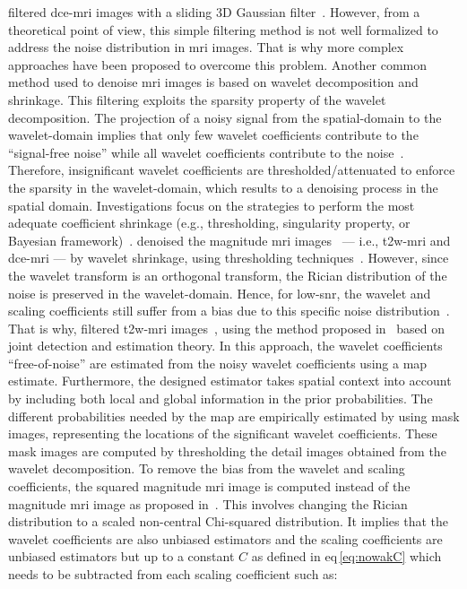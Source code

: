 \begin{enumerate}[leftmargin=*]
\citeauthor{samarasinghe2016semi} filtered \ac{dce}-\ac{mri} images with a
sliding 3D Gaussian filter~\cite{samarasinghe2016semi}.
However, from a theoretical point of view, this simple filtering method is not
well formalized to address the noise distribution in \ac{mri} images.
That is why more complex approaches have been proposed to overcome this problem.
Another common method used to denoise \ac{mri} images is based on wavelet
decomposition and shrinkage.
This filtering exploits the sparsity property of the wavelet decomposition.
The projection of a noisy signal from the spatial-domain to the wavelet-domain
implies that only few wavelet coefficients contribute to the ``signal-free
noise'' while all wavelet coefficients contribute to the
noise~\cite{Donoho1994}.
Therefore, insignificant wavelet coefficients are thresholded/attenuated to
enforce the sparsity in the wavelet-domain, which results to a denoising
process in the spatial domain.
Investigations focus on the strategies to perform the most adequate coefficient
shrinkage (e.g., thresholding, singularity property, or Bayesian
framework)~\cite{Pizurica2002}.
\citeauthor{Ampeliotis2008} denoised the magnitude \ac{mri}
images~\cite{Ampeliotis2007,Ampeliotis2008} --- i.e., \ac{t2w}-\ac{mri} and
\ac{dce}-\ac{mri} --- by wavelet shrinkage, using thresholding
techniques~\cite{Mallat2008}.
However, since the wavelet transform is an orthogonal transform, the Rician
distribution of the noise is preserved in the wavelet-domain.
Hence, for low-\ac{snr}, the wavelet and scaling coefficients still suffer from
a bias due to this specific noise distribution~\cite{Nowak1999}.
That is why, \citeauthor{Lopes2011} filtered \ac{t2w}-\ac{mri}
images~\cite{Lopes2011}, using the method proposed in~\cite{Pizurica2003} based
on joint detection and estimation theory.
In this approach, the wavelet coefficients ``free-of-noise'' are estimated from
the noisy wavelet coefficients using a \ac{map} estimate.
Furthermore, the designed estimator takes spatial context into account by
including both local and global information in the prior probabilities.
The different probabilities needed by the \ac{map} are empirically estimated by
using mask images, representing the locations of the significant wavelet
coefficients.
These mask images are computed by thresholding the detail images obtained from
the wavelet decomposition.
To remove the bias from the wavelet and scaling coefficients, the squared
magnitude \ac{mri} image is computed instead of the magnitude \ac{mri} image as
proposed in~\cite{Nowak1999}.
This involves changing the Rician distribution to a scaled non-central
Chi-squared distribution.
It implies that the wavelet coefficients are also unbiased estimators and the
scaling coefficients are unbiased estimators but up to a constant $C$ as
defined in \acs{eq}\,\eqref{eq:nowakC} which needs to be subtracted from each
scaling coefficient such as:


\end{enumerate}
